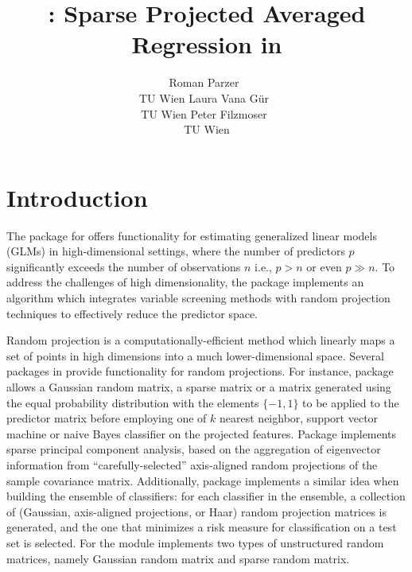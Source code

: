 \documentclass[
  article,
  nojss]{jss}
\author{Roman Parzer~\orcidlink{0000-0003-0893-3190}\\TU Wien \And Laura
Vana Gür~\orcidlink{0000-0002-9613-7604}\\TU Wien \AND Peter
Filzmoser~\orcidlink{0000-0002-8014-4682}\\TU Wien}
\title{\pkg{spar}: Sparse Projected Averaged Regression in \proglang{R}}
\begin{document}
\maketitle


\section{Introduction}\label{sec-intro}

The  package for  \citep{RLanguage} offers
functionality for estimating generalized linear models (GLMs) in
high-dimensional settings, where the number of predictors \(p\)
significantly exceeds the number of observations \(n\) i.e., \(p>n\) or
even \(p\gg n\). To address the challenges of high dimensionality, the
package implements an algorithm which integrates variable screening
methods with random projection techniques to effectively reduce the
predictor space.

Random projection is a computationally-efficient method which linearly
maps a set of points in high dimensions into a much lower-dimensional
space. Several packages in  provide functionality for random
projections. For instance, package 
\citep{RandProR, SIDDHARTH2020100629} allows a Gaussian random matrix, a
sparse matrix \citep{ACHLIOPTAS2003JL, LiHastie2006VerySparseRP} or a
matrix generated using the equal probability distribution with the
elements \(\{-1,1\}\) to be applied to the predictor matrix before
employing one of \(k\) nearest neighbor, support vector machine or naive
Bayes classifier on the projected features. Package 
\citep{SPCAvRPR} implements sparse principal component analysis, based
on the aggregation of eigenvector information from
``carefully-selected'' axis-aligned random projections of the sample
covariance matrix. Additionally, package 
\citep{RPEnsembleR} implements a similar idea when building the ensemble
of classifiers: for each classifier in the ensemble, a collection of
(Gaussian, axis-aligned projections, or Haar) random projection matrices
is generated, and the one that minimizes a risk measure for
classification on a test set is selected. For 
\citep{Python} the  module
\citep{pedregosa2011scikit} implements two types of unstructured random
matrices, namely Gaussian random matrix and sparse random matrix.
\end{document}
